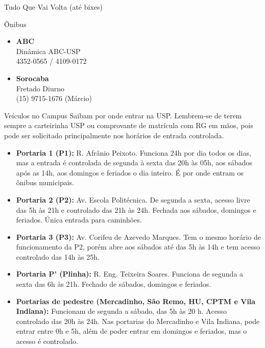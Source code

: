 \begin{secao}{Tudo Que Vai Volta (até bixes)}
\begin{subsecao}{Ônibus}
\begin{itemize}
  \item {\bf ABC}\\
    Dinâmica ABC-USP\\
    4352-0565 / 4109-0172

  \item {\bf Sorocaba}\\
    Fretado Diurno\\
    (15) 9715-1676 (Márcio)

\end{itemize}

\end{subsecao}


\begin{subsecao}{Veículos no Campus}
Saibam por onde entrar na USP. Lembrem-se de terem sempre a carteirinha USP ou
comprovante de matrícula com RG em mãos, pois pode ser solicitado principalmente
nos horários de entrada controlada.
\begin{itemize}
  \item {\bf Portaria 1 (P1):} R. Afrânio Peixoto. Funciona 24h por dia todos os
    dias, mas a entrada é controlada de segunda à sexta das 20h às 05h, aos sábados
    após as 14h, aos domingos e feriados o dia inteiro. É por onde entram os
    ônibus municipais.

  \item {\bf Portaria 2 (P2):} Av. Escola Politécnica. De segunda a sexta, acesso
  livre das 5h às 21h e controlado das 21h às 24h. Fechada aos sábados, domingos
  e feriados. Única entrada para caminhões.

  \item {\bf Portaria 3 (P3):} Av. Corifeu de Azevedo Marques. Tem o mesmo horário
    de funcionamento da P2, porém abre aos sábados até das 5h às 14h e tem acesso
    controlado das 14h às 25h.

  \item {\bf Portaria P' (Plinha):} R. Eng. Teixeira Soares. Funciona de segunda a
  sexta das 6h às 21h. Fechado de sábados, domingos e feriados.


\end{itemize}
\begin{itemize}

  \item {\bf Portarias de pedestre (Mercadinho, São Remo, HU, CPTM e
      Vila Indiana):} Funcionam de segunda a sábado, das 5h às 20 h. Acesso controlado das 20h
      às 24h. Nas portarias do Mercadinho e Vila Indiana, pode entrar entre 0h e 5h, além
      de poder entrar em domingos e feriados, mas o acesso é controlado.


\end{itemize}
\end{subsecao}
\end{secao}
